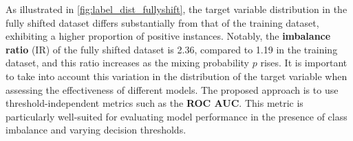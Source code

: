 As illustrated in \cref{fig:label_dist_fullyshift}, the target variable distribution in the fully shifted dataset differs substantially from that of the training dataset, exhibiting a higher proportion of positive instances. Notably, the \textbf{imbalance ratio} (IR) of the fully shifted dataset is 2.36, compared to 1.19 in the training dataset, and this ratio increases as the mixing probability $p$ rises. It is important to take into account this variation in the distribution of the target variable when assessing the effectiveness of different models. The proposed approach is to use threshold-independent metrics such as the \textbf{ROC AUC}. This metric is particularly well-suited for evaluating model performance in the presence of class imbalance and varying decision thresholds.
